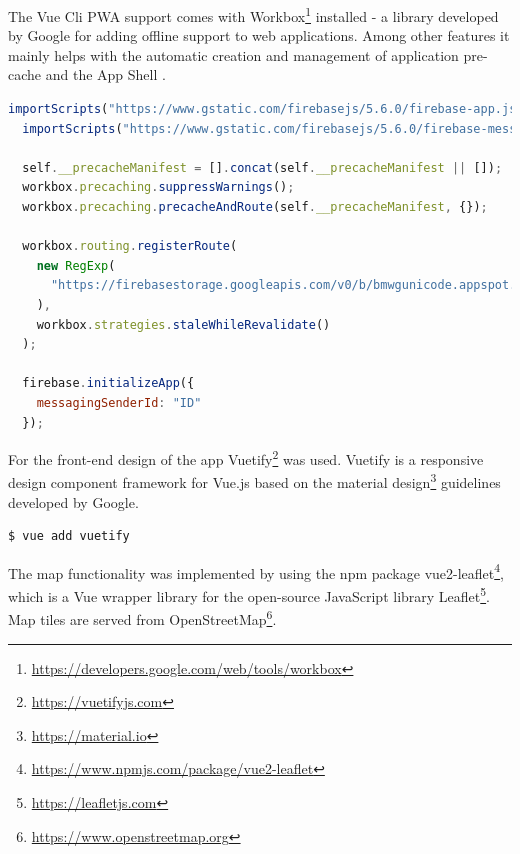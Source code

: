 
The Vue Cli PWA support comes with Workbox\footnote{\url{https://developers.google.com/web/tools/workbox}} installed - a library developed by Google for adding offline support to web applications. Among other features it mainly helps with the automatic creation and management of application pre-cache and the App Shell .

\begin{lstlisting}[language=JavaScript, caption=Service Worker with Workbox and Firebase specific initiation (firebase-messaging-sw.js), label=lst:serviceworker]
  importScripts("https://www.gstatic.com/firebasejs/5.6.0/firebase-app.js");
  importScripts("https://www.gstatic.com/firebasejs/5.6.0/firebase-messaging.js");

  self.__precacheManifest = [].concat(self.__precacheManifest || []);
  workbox.precaching.suppressWarnings();
  workbox.precaching.precacheAndRoute(self.__precacheManifest, {});

  workbox.routing.registerRoute(
    new RegExp(
      "https://firebasestorage.googleapis.com/v0/b/bmwgunicode.appspot.com/.*"
    ),
    workbox.strategies.staleWhileRevalidate()
  );

  firebase.initializeApp({
    messagingSenderId: "ID"
  });

\end{lstlisting}

For the front-end design of the app Vuetify\footnote{\url{https://vuetifyjs.com}} was used. Vuetify is a responsive design component framework for Vue.js based on the material design\footnote{\url{https://material.io}} guidelines developed by Google.

\begin{lstlisting}[language=bash, caption=Command to add Vuetify to the Vue.js project, label=lst:vuetify]
  $ vue add vuetify
\end{lstlisting}

The map functionality was implemented by using the npm package vue2-leaflet\footnote{\url{https://www.npmjs.com/package/vue2-leaflet}}, which is a Vue wrapper library for the open-source JavaScript library Leaflet\footnote{\url{https://leafletjs.com}}. Map tiles are served from OpenStreetMap\footnote{\url{https://www.openstreetmap.org}}.
\\

